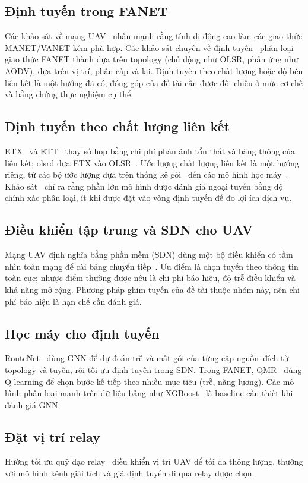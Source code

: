 \documentclass[12pt,a4paper]{report}
\begin{document}
\subsection{Định tuyến trong FANET}
Các khảo sát về mạng UAV~\cite{gupta,hayat} nhấn mạnh rằng tính di động cao làm các giao thức MANET/VANET kém phù hợp. Các khảo sát chuyên về định tuyến~\cite{arafat,lakew} phân loại giao thức FANET thành dựa trên topology (chủ động như OLSR, phản ứng như AODV), dựa trên vị trí, phân cấp và lai. Định tuyến theo chất lượng hoặc độ bền liên kết là một hướng đã có; đóng góp của đề tài cần được đối chiếu ở mức cơ chế và bằng chứng thực nghiệm cụ thể.

\subsection{Định tuyến theo chất lượng liên kết}
ETX~\cite{decouto} và ETT~\cite{draves} thay số hop bằng chi phí phản ánh tổn thất và băng thông của liên kết; olsrd đưa ETX vào OLSR~\cite{olsrd}. Ước lượng chất lượng liên kết là một hướng riêng, từ các bộ ước lượng dựa trên thống kê gói~\cite{baccour} đến các mô hình học máy~\cite{cerar}. Khảo sát~\cite{cerar} chỉ ra rằng phần lớn mô hình được đánh giá ngoại tuyến bằng độ chính xác phân loại, ít khi được đặt vào vòng định tuyến để đo lợi ích dịch vụ.

\subsection{Điều khiển tập trung và SDN cho UAV}
Mạng UAV định nghĩa bằng phần mềm (SDN) dùng một bộ điều khiển có tầm nhìn toàn mạng để cài bảng chuyển tiếp~\cite{abir}. Ưu điểm là chọn tuyến theo thông tin toàn cục; nhược điểm thường được nêu là chi phí báo hiệu, độ trễ điều khiển và khả năng mở rộng. Phương pháp ghim tuyến của đề tài thuộc nhóm này, nên chi phí báo hiệu là hạn chế cần đánh giá.

\subsection{Học máy cho định tuyến}
RouteNet~\cite{routenet} dùng GNN để dự đoán trễ và mất gói của từng cặp nguồn--đích từ topology và tuyến, rồi tối ưu định tuyến trong SDN. Trong FANET, QMR~\cite{qmr} dùng Q-learning để chọn bước kế tiếp theo nhiều mục tiêu (trễ, năng lượng). Các mô hình phân loại mạnh trên dữ liệu bảng như XGBoost~\cite{xgboost} là baseline cần thiết khi đánh giá GNN.

\subsection{Đặt vị trí relay}
Hướng tối ưu quỹ đạo relay~\cite{zeng} điều khiển vị trí UAV để tối đa thông lượng, thường với mô hình kênh giải tích và giả định tuyến đi qua relay được chọn.
\end{document}
